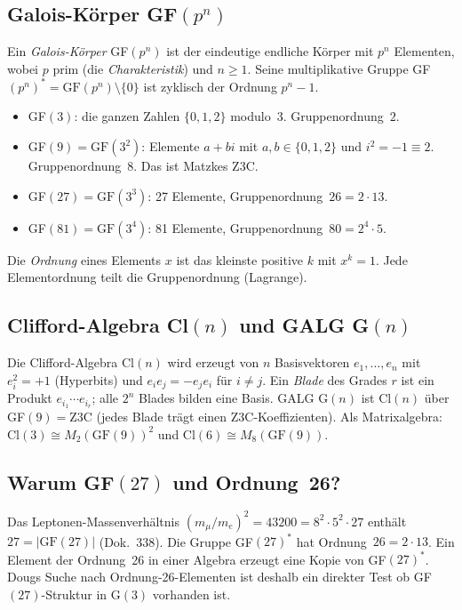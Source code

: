 \subsection*{Galois-Körper GF$(p^n)$}

Ein \emph{Galois-Körper} GF$(p^n)$ ist der eindeutige endliche Körper mit $p^n$ Elementen,
wobei $p$ prim (die \emph{Charakteristik}) und $n \geq 1$.
Seine multiplikative Gruppe GF$(p^n)^* = \text{GF}(p^n) \setminus \{0\}$
ist zyklisch der Ordnung $p^n - 1$.
\begin{itemize}
  \item GF$(3)$: die ganzen Zahlen $\{0,1,2\}$ modulo~3. Gruppenordnung~$2$.
  \item GF$(9) = \text{GF}(3^2)$: Elemente $a + bi$ mit $a,b \in \{0,1,2\}$
        und $i^2 = -1 \equiv 2$. Gruppenordnung~$8$. Das ist Matzkes Z3C.
  \item GF$(27) = \text{GF}(3^3)$: 27 Elemente, Gruppenordnung~$26 = 2 \cdot 13$.
  \item GF$(81) = \text{GF}(3^4)$: 81 Elemente, Gruppenordnung~$80 = 2^4 \cdot 5$.
\end{itemize}
Die \emph{Ordnung} eines Elements $x$ ist das kleinste positive $k$
mit $x^k = 1$. Jede Elementordnung teilt die Gruppenordnung (Lagrange).

\subsection*{Clifford-Algebra Cl$(n)$ und GALG G$(n)$}

Die Clifford-Algebra Cl$(n)$ wird erzeugt von $n$ Basisvektoren $e_1,\ldots,e_n$
mit $e_i^2 = +1$ (Hyperbits) und $e_i e_j = -e_j e_i$ für $i \neq j$.
Ein \emph{Blade} des Grades $r$ ist ein Produkt $e_{i_1} \cdots e_{i_r}$;
alle $2^n$ Blades bilden eine Basis.
GALG G$(n)$ ist Cl$(n)$ über GF$(9) = \text{Z3C}$ (jedes Blade trägt einen
Z3C-Koeffizienten). Als Matrixalgebra:
$\text{Cl}(3) \cong M_2(\text{GF}(9))^2$ und $\text{Cl}(6) \cong M_8(\text{GF}(9))$.

\subsection*{Warum GF$(27)$ und Ordnung~26?}

Das Leptonen-Massenverhältnis $(m_\mu/m_e)^2 = 43200 = 8^2 \cdot 5^2 \cdot 27$
enthält $27 = |\text{GF}(27)|$ (Dok.~338).
Die Gruppe GF$(27)^*$ hat Ordnung~$26 = 2 \cdot 13$.
Ein Element der Ordnung~26 in einer Algebra erzeugt eine Kopie von GF$(27)^*$.
Dougs Suche nach Ordnung-26-Elementen ist deshalb ein direkter Test
ob GF$(27)$-Struktur in G$(3)$ vorhanden ist.

